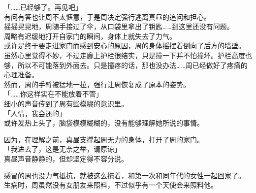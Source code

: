 「……已经够了。再见吧」\\

有问有答也让周不太惬意，于是周决定强行逃离真昼的追问和担心。\\

摇摇晃晃地，周随手接过了伞，从口袋里拿出了钥匙……到这里还没有问题。\\

周略有迟缓地打开自家门的瞬间，身体上就失去了力气。\\

或许是终于要走进家门而感到安心的原因，周的身体摇摆着倒向了后方的墙壁。\\

虽然心里觉得不妙，不过走廊上护栏很结实，只是撞一下并不怕撞坏。护栏高度也够，所以不可能落到外面去。只是撞疼的话，那也没办法……周已经做好了疼痛的心理准备。\\

然而，周的手臂被猛地一拉，强行让周恢复成了原本的姿势。\\

「……你这样实在不能放着不管」\\

细小的声音传到了周有些模糊的意识里。\\

「人情，我会还的」\\

或许发热上头了，脑袋模模糊糊的，没有能够理解她所说的事情。

因为，在理解之前，真昼支撑起周无力的身体，打开了周的家门。\\

「我进去了，这是无奈之举，请原谅」\\

真昼声音静静的，但却坚定得不容分说。

感冒的周也没力气抵抗，就被这么拖着，和第一次和同年代的女性一起回家了。\\

生病时，周虽然没有女朋友来照料，不过似乎有一个天使会来照料他。

